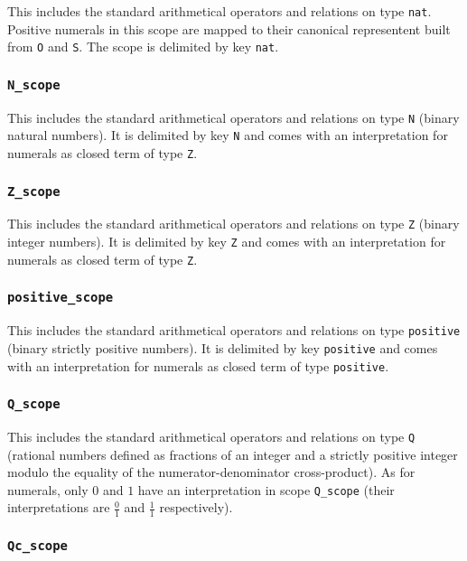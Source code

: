This includes the standard arithmetical operators and relations on
type {\tt nat}. Positive numerals in this scope are mapped to their
canonical representent built from {\tt O} and {\tt S}. The scope is
delimited by key {\tt nat}.

\subsubsection{\tt N\_scope}

This includes the standard arithmetical operators and relations on
type {\tt N} (binary natural numbers). It is delimited by key {\tt N}
and comes with an interpretation for numerals as closed term of type {\tt Z}.

\subsubsection{\tt Z\_scope}

This includes the standard arithmetical operators and relations on
type {\tt Z} (binary integer numbers). It is delimited by key {\tt Z} 
and comes with an interpretation for numerals as closed term of type {\tt Z}.

\subsubsection{\tt positive\_scope}

This includes the standard arithmetical operators and relations on
type {\tt positive} (binary strictly positive numbers). It is
delimited by key {\tt positive} and comes with an interpretation for
numerals as closed term of type {\tt positive}.

\subsubsection{\tt Q\_scope}

This includes the standard arithmetical operators and relations on
type {\tt Q} (rational numbers defined as fractions of an integer and
a strictly positive integer modulo the equality of the
numerator-denominator cross-product). As for numerals, only $0$ and
$1$ have an interpretation in scope {\tt Q\_scope} (their
interpretations are $\frac{0}{1}$ and $\frac{1}{1}$ respectively).

\subsubsection{\tt Qc\_scope}

